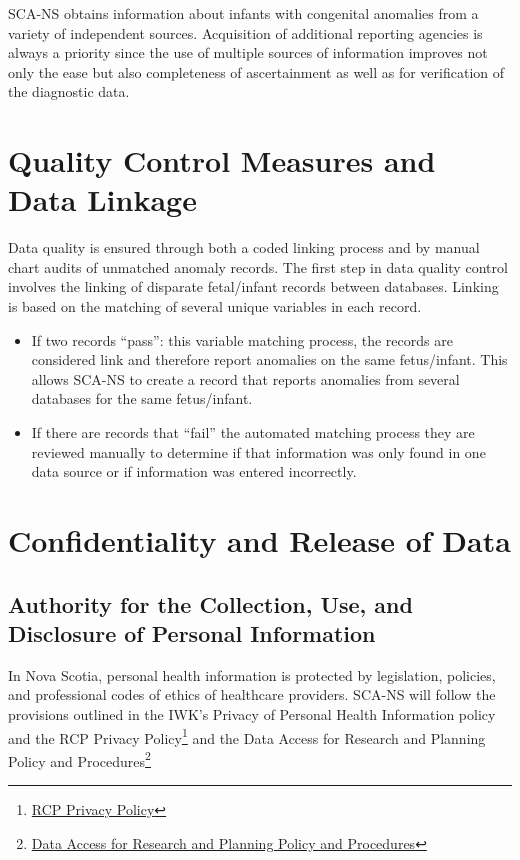 \documentclass[
]{krantz}
\begin{document}
SCA-NS obtains information about infants with congenital anomalies from a variety of independent sources. Acquisition of additional reporting agencies is always a priority since the use of multiple sources of information improves not only the ease but also completeness of ascertainment as well as for verification of the diagnostic data.

\hypertarget{section-13}{%
\section{Quality Control Measures and Data Linkage}\label{section-13}}

Data quality is ensured through both a coded linking process and by manual chart audits of unmatched anomaly records. The first step in data quality control involves the linking of disparate fetal/infant records between databases. Linking is based on the matching of several unique variables in each record.

\begin{itemize}
\item
  If two records ``pass'': this variable matching process, the records are considered link and therefore report anomalies on the same fetus/infant. This allows SCA-NS to create a record that reports anomalies from several databases for the same fetus/infant.
\item
  If there are records that ``fail'' the automated matching process they are reviewed manually to determine if that information was only found in one data source or if information was entered incorrectly.
\end{itemize}

\hypertarget{section-14}{%
\section{Confidentiality and Release of Data}\label{section-14}}

\hypertarget{authority-for-the-collection-use-and-disclosure-of-personal-information}{%
\subsection*{Authority for the Collection, Use, and Disclosure of Personal Information}\label{authority-for-the-collection-use-and-disclosure-of-personal-information}}


In Nova Scotia, personal health information is protected by legislation, policies, and professional codes of ethics of healthcare providers. SCA-NS will follow the provisions outlined in the IWK's Privacy of Personal Health Information policy and the RCP Privacy Policy\footnote{ \href{http://rcp.nshealth.ca/about/privacy-personal-information}{RCP Privacy Policy}} and the Data Access for Research and Planning Policy and Procedures\footnote{ \href{https://rcp.nshealth.ca/sites/default/files/atlee-database/nsapd_data_access_policy_nov2007.pdf}{Data Access for Research and Planning Policy and Procedures}}
\end{document}
